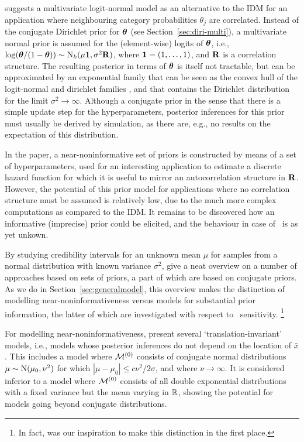 \textcite{2009:bickis} suggests a multivariate logit-normal model as an alternative to the IDM
for an application where neighbouring category probabilities $\theta_j$ are correlated.
Instead of the conjugate Dirichlet prior for $\boldsymbol{\theta}$ (see Section~\ref{sec:diri-multi}),
a multivariate normal prior is assumed for the (element-wise) logits of $\boldsymbol{\theta}$,
i.e., $\log(\boldsymbol{\theta}/(1-\boldsymbol{\theta})) \sim \operatorname{N}_k(\mu \mathbf{1}, \sigma^2\mathbf{R})$,
where $\mathbf{1} = (1, \ldots, 1)$, and $\mathbf{R}$ is a correlation structure.
The resulting posterior in terms of $\boldsymbol{\theta}$ is itself not tractable, but can be approximated
by an exponential family that can be seen as the convex hull of the logit-normal
and dirichlet families \parencite[p.~189]{2009:bickis},
and that contains the Dirichlet distribution for the limit $\sigma^2 \to \infty$.
Although a conjugate prior in the sense that there is a simple update step for the hyperparameters,
posterior inferences for this prior must usually be derived by simulation,
as there are, e.g., no results on the expectation of this distribution.

In the paper, a near-noninformative set of priors is constructed
by means of a set of hyperparameters,
used for an interesting application to estimate a discrete hazard function
for which it is useful to mirror an autocorrelation structure in $\mathbf{R}$.
However, the potential of this prior model for applications where no correlation structure must be assumed is
relatively low, due to the much more complex computations as compared to the IDM.
It remains to be discovered how an informative (imprecise) prior could be elicited,
and the behaviour in case of \pdc\ is as yet unkown.

\medskip

By studying credibility intervals for an unknown mean $\mu$ for samples from a normal distribution with known variance $\sigma^2$,
\textcite{1991:pericchi} give a neat overview on a number of approaches based on sets of priors,
a part of which are based on conjugate priors.
As we do in Section~\ref{sec:generalmodel},
this overview makes the distinction of modelling near-noninformativeness
versus models for substantial prior information,
the latter of which are investigated with respect to \pdc\ sensitivity.%
\footnote{In fact, \textcite{1991:pericchi} was our inspiration to make this distinction in the first place.}

For modelling near-noninformativeness, \textcite[\S 3]{1991:pericchi}
present several `translation-invariant' models,
i.e., models whose posterior inferences do not depend on the location of $\bar{x}$.
This includes a model where $\mathcal{M}^{(0)}$ consists of conjugate normal distributions $\mu \sim \operatorname{N}(\mu_0, \nu^2)$
for which $|\mu - \mu_0| \le c \nu^2 / 2\sigma$, and where $\nu \to \infty$.
It is considered inferior to a model where $\mathcal{M}^{(0)}$ consists of all double exponential distributions
with a fixed variance but the mean varying in $\mathbb{R}$, %
showing the potential for models going beyond conjugate distributions.

